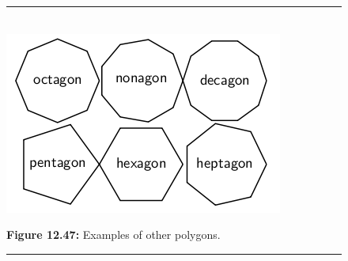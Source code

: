	\begin{figure}[H] %
    \begin{center}
    \rule[.1in]{\figurerulewidth}{.005in} \\
        \label{m39368*uid93!!!underscore!!!media}\label{m39368*uid93!!!underscore!!!printimage}\includegraphics{col11306.imgs/m39368_MG10C13_046.png} %
      \vspace{2pt}
    \vspace{\rubberspace}\par \begin{cnxcaption}
	  \small \textbf{Figure 12.47: }Examples of other polygons.
	\end{cnxcaption}
    \vspace{.1in}
    \rule[.1in]{\figurerulewidth}{.005in} \\
    \end{center}
 \end{figure}       
      \label{m39368*eip-210}
